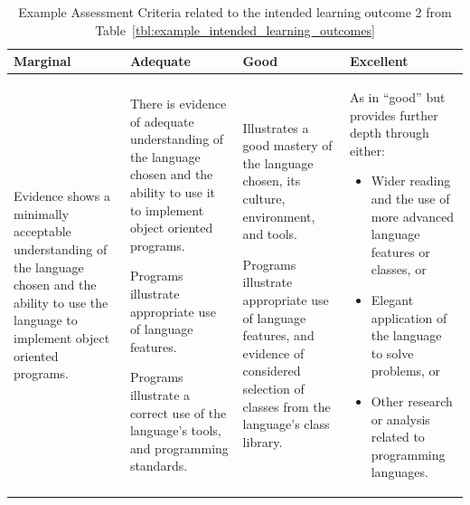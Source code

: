 \begin{table}[!t]
  \footnotesize
\caption{Example Assessment Criteria related to the intended learning outcome 2 from Table~\ref{tbl:example_intended_learning_outcomes}}
\label{tbl:example_assessment_criteria}
\centering
\begin{tabular}{|p{1.5in}|p{1.5in}|p{1.5in}|p{1.5in}|}
\hline
\textbf{Marginal} & \textbf{Adequate} & \textbf{Good} & \textbf{Excellent} \\
\hline
Evidence shows a minimally acceptable understanding of the language chosen and the ability to use the language to implement object oriented programs. 
&
There is evidence of adequate understanding of the language chosen and the ability to use it to implement object oriented programs.

Programs illustrate appropriate use of language features.

Programs illustrate a correct use of the language’s tools, and programming standards.
&
	Illustrates a good mastery of the language chosen, its culture, environment, and tools.

Programs illustrate appropriate use of language features, and evidence of considered selection of classes from the language’s class library.	
&
As in “good” but provides further depth through either:

\begin{itemize}
  \item Wider reading and the use of more advanced language features or classes, or
  \item Elegant application of the language to solve problems, or
  \item Other research or analysis related to programming languages.
\end{itemize}
\\
\hline
\end{tabular}
\end{table}

